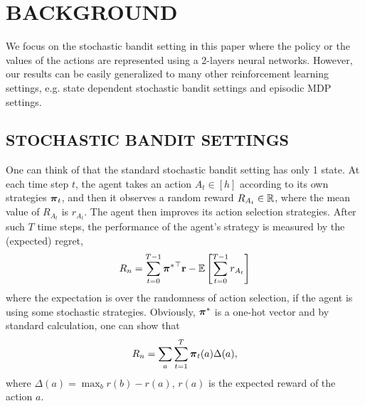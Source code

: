 \section{BACKGROUND}
\label{sec:background}

We focus on the stochastic bandit setting in this paper where the policy or the values of the actions are represented using a 2-layers neural networks.  
However, our results can be easily generalized to many other reinforcement learning settings, e.g. state dependent stochastic bandit settings and episodic MDP settings.

\subsection{STOCHASTIC BANDIT SETTINGS}
\label{subsec:settings}

One can think of that the standard stochastic bandit setting has only 1 state.  
At each time step $t$, the agent takes an action $A_t \in [h]$ according to its own strategies ${\boldsymbol{\pi}}_t$, and then it observes a random reward $R_{A_t} \in {\mathbb{R}}$, where the mean value of $R_{A_t}$ is $r_{A_t}$. 
The agent then improves its action selection strategies. 
After such $T$ time steps, the performance of the agent's strategy is measured by the (expected) regret,
\begin{equation}
\label{eq:expected_regret}
R_n = \sum\limits_{t=0}^{T-1}{{{\boldsymbol{\pi}}^*}^\top {\mathbf{r}}} - {\mathbb{E}} \left[ \sum\limits_{t=0}^{T-1}{  r_{ A_t}  } \right] 
\end{equation}
where the expectation is over the randomness of action selection, if the agent is using some stochastic strategies.
Obviously, ${\boldsymbol{\pi}}^*$ is a one-hot vector and by standard calculation, one can show that
\[
R_n = \sum_a \sum_{t=1}^T {\boldsymbol{\pi}}_t(a) \Delta(a),
\]
where $\Delta(a) = \max_b r(b)- r(a)$, $r(a)$ is the expected reward of the action $a$.


